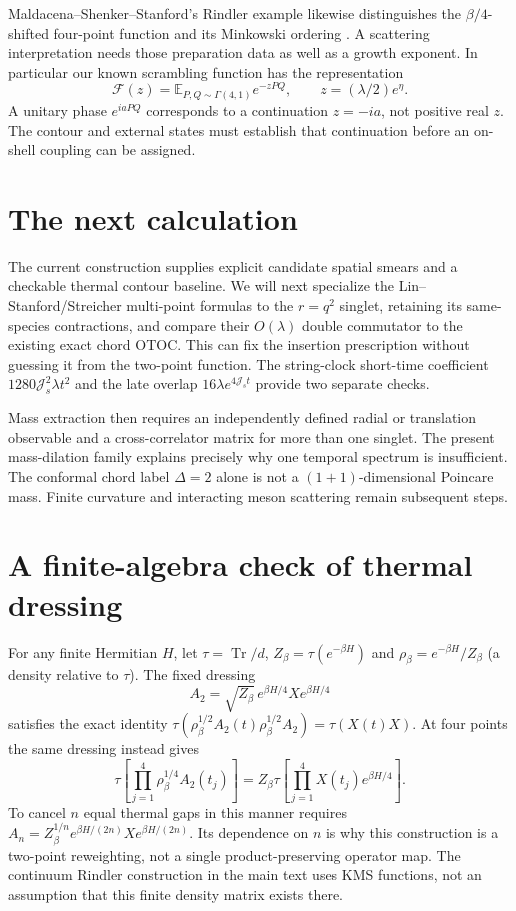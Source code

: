 \documentclass[11pt,a4paper]{article}
\newcommand{\Js}{\mathcal J_s}
\newcommand{\Tr}{\operatorname{Tr}}
\begin{document}
Maldacena--Shenker--Stanford's Rindler example likewise distinguishes
the $\beta/4$-shifted four-point function and its Minkowski ordering
\cite{chaos}. A scattering interpretation needs those preparation
data as well as a growth exponent. In particular our known scrambling
function has the representation
\begin{equation}
 \mathcal F(z)=\mathbb E_{P,Q\sim\Gamma(4,1)}e^{-zPQ},\qquad
 z=(\lambda/2)e^\eta.
\end{equation}
A unitary phase $e^{iaPQ}$ corresponds to a continuation $z=-ia$,
not positive real $z$. The contour and external states must establish
that continuation before an on-shell coupling can be assigned.

\section{The next calculation}
The current construction supplies explicit candidate spatial smears
and a checkable thermal contour baseline. We will next specialize the
Lin--Stanford/Streicher multi-point formulas to the $r=q^2$ singlet,
retaining its same-species contractions, and compare their
$O(\lambda)$ double commutator to the existing exact chord OTOC.
This can fix the insertion prescription without guessing it from
the two-point function. The string-clock short-time coefficient
$1280\Js^2\lambda t^2$ and the late overlap
$16\lambda e^{4\Js t}$ provide two separate checks.

Mass extraction then requires an independently defined radial or
translation observable and a cross-correlator matrix for more than
one singlet. The present mass-dilation family explains precisely why
one temporal spectrum is insufficient. The conformal chord label
$\Delta=2$ alone is not a $(1+1)$-dimensional Poincare mass. Finite
curvature and interacting meson scattering remain subsequent steps.

\appendix
\section{A finite-algebra check of thermal dressing}
For any finite Hermitian $H$, let $\tau=\Tr/d$,
$Z_\beta=\tau(e^{-\beta H})$ and
$\rho_\beta=e^{-\beta H}/Z_\beta$ (a density relative to $\tau$).
The fixed dressing
\begin{equation}
 A_2=\sqrt{Z_\beta}\,e^{\beta H/4}Xe^{\beta H/4}
\end{equation}
satisfies the exact identity
$\tau(\rho_\beta^{1/2}A_2(t)\rho_\beta^{1/2}A_2)=\tau(X(t)X)$.
At four points the same dressing instead gives
\begin{equation}
 \tau\!\left[\prod_{j=1}^4\rho_\beta^{1/4}A_2(t_j)\right]
 =Z_\beta\tau\!\left[\prod_{j=1}^4X(t_j)e^{\beta H/4}\right].
\end{equation}
To cancel $n$ equal thermal gaps in this manner requires
$A_n=Z_\beta^{1/n}e^{\beta H/(2n)}Xe^{\beta H/(2n)}$.
Its dependence on $n$ is why this construction is a two-point
reweighting, not a single product-preserving operator map. The
continuum Rindler construction in the main text uses KMS functions,
not an assumption that this finite density matrix exists there.
\end{document}
